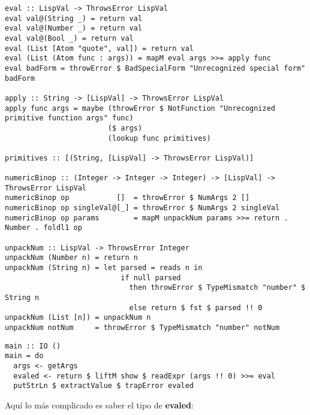 \begin{minipage}{\linewidth}
\begin{tiny}
\begin{lstlisting}[frame=single]
eval :: LispVal -> ThrowsError LispVal
eval val@(String _) = return val
eval val@(Number _) = return val
eval val@(Bool _) = return val
eval (List [Atom "quote", val]) = return val
eval (List (Atom func : args)) = mapM eval args >>= apply func
eval badForm = throwError $ BadSpecialForm "Unrecognized special form" badForm

apply :: String -> [LispVal] -> ThrowsError LispVal
apply func args = maybe (throwError $ NotFunction "Unrecognized primitive function args" func)
                        ($ args)
                        (lookup func primitives)

primitives :: [(String, [LispVal] -> ThrowsError LispVal)]

numericBinop :: (Integer -> Integer -> Integer) -> [LispVal] -> ThrowsError LispVal
numericBinop op           []  = throwError $ NumArgs 2 []
numericBinop op singleVal@[_] = throwError $ NumArgs 2 singleVal
numericBinop op params        = mapM unpackNum params >>= return . Number . foldl1 op

unpackNum :: LispVal -> ThrowsError Integer
unpackNum (Number n) = return n
unpackNum (String n) = let parsed = reads n in 
                           if null parsed 
                             then throwError $ TypeMismatch "number" $ String n
                             else return $ fst $ parsed !! 0
unpackNum (List [n]) = unpackNum n
unpackNum notNum     = throwError $ TypeMismatch "number" notNum
\end{lstlisting}
\end{tiny}
\end{minipage}

\begin{minipage}{\linewidth}
\begin{footnotesize}
\begin{lstlisting}[frame=single]
main :: IO ()
main = do
  args <- getArgs
  evaled <- return $ liftM show $ readExpr (args !! 0) >>= eval
  putStrLn $ extractValue $ trapError evaled
\end{lstlisting}
\end{footnotesize}
\end{minipage}

Aqu\'i lo m\'as complicado es saber el tipo de \textbf{evaled}:


